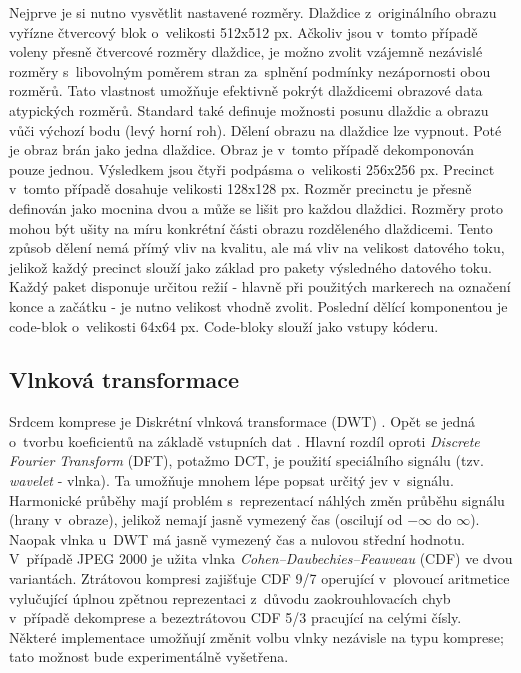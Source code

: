 \noindent Nejprve je si nutno vysvětlit nastavené rozměry. Dlaždice z~originálního obrazu vyřízne čtvercový blok o~velikosti 512x512 px. Ačkoliv jsou v~tomto případě voleny přesně čtvercové rozměry dlaždice, je možno zvolit vzájemně nezávislé rozměry s~libovolným poměrem stran za~splnění podmínky nezápornosti obou rozměrů. Tato vlastnost umožňuje efektivně pokrýt dlaždicemi obrazové data atypických rozměrů. Standard také definuje možnosti posunu dlaždic a obrazu vůči výchozí bodu (levý horní roh). Dělení obrazu na dlaždice lze vypnout. Poté je obraz brán jako jedna dlaždice. Obraz je v~tomto případě dekomponován pouze jednou. Výsledkem jsou čtyři podpásma o~velikosti 256x256 px. Precinct v~tomto případě dosahuje velikosti 128x128 px. Rozměr precinctu je přesně definován jako mocnina dvou a může se lišit pro každou dlaždici. Rozměry proto mohou být ušity na míru konkrétní části obrazu rozděleného dlaždicemi. Tento způsob dělení nemá přímý vliv na kvalitu, ale má vliv na velikost datového toku, jelikož každý precinct slouží jako základ pro pakety výsledného datového toku. Každý paket disponuje určitou režií - hlavně při použitých markerech na označení konce a začátku - je nutno velikost vhodně zvolit. Poslední dělící komponentou je code-blok o~velikosti 64x64 px. Code-bloky slouží jako vstupy kóderu.


\subsection*{Vlnková transformace}
Srdcem komprese je Diskrétní vlnková transformace (DWT) \cite{vlnkova}. Opět se jedná o~tvorbu koeficientů na základě vstupních dat \cite{intro}. Hlavní rozdíl oproti \textit{Discrete Fourier Transform} (DFT), potažmo DCT, je použití speciálního signálu (tzv. \textit{wavelet} - vlnka). Ta umožňuje mnohem lépe popsat určitý jev v~signálu. Harmonické průběhy mají problém s~reprezentací náhlých změn průběhu signálu (hrany v~obraze), jelikož nemají jasně vymezený čas (oscilují od $-\infty$ do $\infty$). Naopak vlnka u~DWT má jasně vymezený čas a nulovou střední hodnotu.\\
V~případě JPEG 2000 je užita vlnka \textit{Cohen–Daubechies–Feauveau} (CDF) ve dvou variantách. Ztrátovou kompresi zajišťuje CDF 9/7 operující v~plovoucí aritmetice vylučující úplnou zpětnou reprezentaci z~důvodu zaokrouhlovacích chyb v~případě dekomprese a bezeztrátovou CDF 5/3 pracující na celými čísly. Některé implementace umožňují změnit volbu vlnky nezávisle na typu komprese; tato možnost bude experimentálně vyšetřena. 

